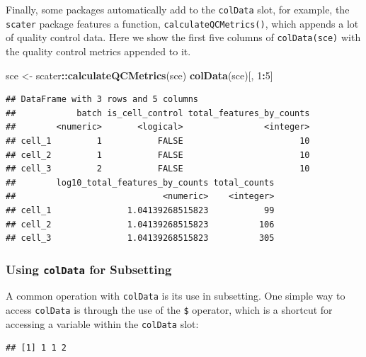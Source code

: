 \documentclass[]{book}
\newenvironment{Shaded}{\begin{snugshade}}{\end{snugshade}}
\newcommand{\DecValTok}[1]{\textcolor[rgb]{0.00,0.00,0.81}{#1}}
\newcommand{\KeywordTok}[1]{\textcolor[rgb]{0.13,0.29,0.53}{\textbf{#1}}}
\newcommand{\NormalTok}[1]{#1}
\newcommand{\OperatorTok}[1]{\textcolor[rgb]{0.81,0.36,0.00}{\textbf{#1}}}
\newcommand{\StringTok}[1]{\textcolor[rgb]{0.31,0.60,0.02}{#1}}
\begin{document}
Finally, some packages automatically add to the \texttt{colData} slot, for example, the \texttt{scater} package features a function, \texttt{calculateQCMetrics()}, which appends a lot of quality control data. Here we show the first five columns of \texttt{colData(sce)} with the quality control metrics appended to it.

\begin{Shaded}
\begin{Highlighting}[]
\NormalTok{sce <-}\StringTok{ }\NormalTok{scater}\OperatorTok{::}\KeywordTok{calculateQCMetrics}\NormalTok{(sce)}
\KeywordTok{colData}\NormalTok{(sce)[, }\DecValTok{1}\OperatorTok{:}\DecValTok{5}\NormalTok{]}
\end{Highlighting}
\end{Shaded}

\begin{verbatim}
## DataFrame with 3 rows and 5 columns
##            batch is_cell_control total_features_by_counts
##        <numeric>       <logical>                <integer>
## cell_1         1           FALSE                       10
## cell_2         1           FALSE                       10
## cell_3         2           FALSE                       10
##        log10_total_features_by_counts total_counts
##                             <numeric>    <integer>
## cell_1               1.04139268515823           99
## cell_2               1.04139268515823          106
## cell_3               1.04139268515823          305
\end{verbatim}

\hypertarget{using-coldata-for-subsetting}{%
\subsubsection{\texorpdfstring{Using \texttt{colData} for Subsetting}{Using colData for Subsetting}}\label{using-coldata-for-subsetting}}

A common operation with \texttt{colData} is its use in subsetting. One simple way to access \texttt{colData} is through the use of the \texttt{\$} operator, which is a shortcut for accessing a variable within the \texttt{colData} slot:

\begin{Shaded}
\end{Shaded}

\begin{verbatim}
## [1] 1 1 2
\end{verbatim}
\end{document}
